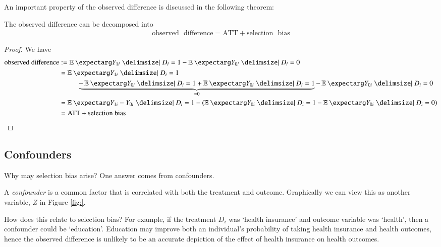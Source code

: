             An important property of the observed difference is discussed in the following theorem:
            \begin{theorem}
                The observed difference can be decomposed into
                \begin{align}
                    \mathrm{observed}\text{ }\mathrm{difference} = \mathrm{ATT} + \mathrm{selection}\text{ }\mathrm{bias}
                \end{align}
            \end{theorem}
            \begin{proof}
                We have
                \begin{align*}
                    \text{observed difference}
                        &:= \expect{Y_{1i}|D_i=1} - \expect{Y_{0i}|D_i=0}   \\
                        &= \expect{Y_{1i}|D_i=1} \\
                        &\phantom{=}\qquad\underbrace{- \expect{Y_{0i}|D_i = 1} + \expect{Y_{0i}|D_i = 1}}_{=0} - \expect{Y_{0i}|D_i=0}    \\
                        &= \expect{Y_{1i} - Y_{0i}|D_i=1} - \left(\expect{Y_{0i}|D_i = 1} - \expect{Y_{0i}|D_i = 0}\right)  \\
                        &= \text{ATT} + \text{selection bias}
                \end{align*}
            \end{proof}

        \subsection{Confounders}
            Why may selection bias arise? One answer comes from confounders.
            \begin{definition}[Confounder]
                A \textit{confounder} is a common factor that is correlated with both the treatment and outcome. Graphically we can view this as another variable, $Z$ in Figure \ref{fig:}.
            \end{definition}  

            How does this relate to selection bias? For example, if the treatment $D_i$ was `health insurance' and outcome variable was `health', then a confounder could be `education'. Education may improve both an individual’s probability of taking health insurance and health outcomes, hence the observed difference is unlikely to be an accurate depiction of the effect of health insurance on health outcomes.


